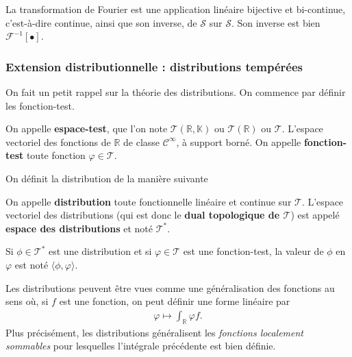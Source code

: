 \begin{Theo} La transformation de Fourier est une application linéaire bijective et bi-continue, c'est-à-dire continue, ainsi que son inverse, de $\mathcal S$ sur $\mathcal S$. Son inverse est bien $\mathcal F^{-1}[\bullet]$.
\end{Theo} 

\subsubsection{Extension distributionnelle : distributions tempérées} 

On fait un petit rappel sur la théorie des distributions. On commence par définir les fonction-test.
\begin{Defi} 
    On appelle {\bf espace-test}, que l'on note $\mathcal T(\mathbb R , \mathbb K)$ ou $\mathcal T(\mathbb R)$ ou $\mathcal T$. L'espace vectoriel des fonctions de $\mathbb R$ de classe $\mathcal C^\infty$, à support borné. On appelle {\bf fonction-test} toute fonction $\varphi \in \mathcal T$.
\end{Defi}

On définit la distribution de la manière suivante

\begin{Defi}[\bf Distribution] 
    On appelle {\bf distribution} toute fonctionnelle linéaire et continue sur $\mathcal T$. L'espace vectoriel des distributions (qui est donc le {\bf dual topologique de $\mathcal T$}) est appelé {\bf espace des distributions} et noté $\mathcal T^\ast$. 
\end{Defi}

Si $\phi \in \mathcal T^\ast$ est une distribution et si $\varphi \in \mathcal T$ est une fonction-test, la valeur de $\phi$ en $\varphi$ est noté $\langle \phi , \varphi \rangle$.

\smallskip

Les distributions peuvent être vues comme une généralisation des fonctions au sens où, si $f$ est une fonction, on peut définir une forme linéaire par 
\begin{eqnarray}
    \varphi \longmapsto \int_{\mathbb R} \varphi f.
\end{eqnarray}
Plus précisément, les distributions généralisent les {\em fonctions localement sommables} pour lesquelles l'intégrale précédente est bien définie.

\smallskip

